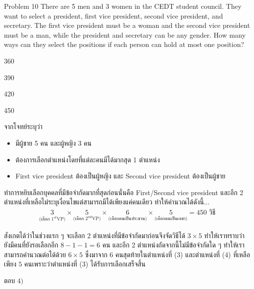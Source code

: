 \documentclass[11pt]{scrartcl}
\begin{document}
\newpage

\begin{problembox}{Problem 10}
There are 5 men and 3 women in the CEDT student council. They want to select a president, first vice president, second vice president, and secretary. The first vice president must be a woman and the second vice president must be a man, while the president and secretary can be any gender. How many ways can they select the positions if each person can hold at most one position?
 
\begin{choices}
\item 360
\item 390
\item 420
\item 450
\end{choices}
\end{problembox}

\begin{solutionbox}
  จากโจทย์ระบุว่า
  \begin{itemize}
    \item มีผู้ชาย 5 คน และผู้หญิง 3 คน
    \item ต้องการเลือกตำแหน่งโดยที่แต่ละคนมีได้มากสุด 1 ตำแหน่ง
    \item First vice president ต้องเป็นผู้หญิง และ Second vice president ต้องเป็นผู้ชาย 
  \end{itemize}
  
  ทำการหยิบเลือกบุคคลที่มีข้อจำกัดมากที่สุดก่อนนั่นคือ First/Second vice president และอีก 2 ตำแหน่งที่เหลือไม่ระบุเงื่อนไขแต่สามารถมีได้เพียงแค่คนเดียว ทำให้คำนวณได้ดังนี้...
  \begin{align*}
    \underset{\text{(เลือก $1^{st}$VP)}}{3} \times 
    \underset{\text{(เลือก $2^{nd}$VP})}{5} \times 
    \underset{\text{(เลือกคนเป็นประธาน)}}{6} \times 
    \underset{\text{(เลือกคนเป็นเลขา)}}{5}
    = 450 \text{ วิธี}
  \end{align*}

  สังเกตได้ว่าในช่วงแรก ๆ จะเลือก 2 ตำแหน่งที่มีข้อจำกัดมาก่อนจึงจัดวิธีได้ $3 \times 5$ ทำให้เราทราบว่ายังมีคนที่ยังรอเลือกอีก $8-1-1=6$ คน
  และอีก 2 ตำแหน่งถัดจากนี้ไม่มีข้อจำกัดใด ๆ ทำให้เราสามารถคำนวณต่อได้ด้วย $6 \times 5$ ซึ่งมาจาก 6 คนสุดท้ายในตำแหน่งที่ (3) 
  และตำแหน่งที่ (4) ที่เหลือเพียง $5$ คนเพราะว่าตำแหน่งที่ (3) ได้รับการเลือกเสร็จสิ้น

  ตอบ $\boxed{4)}$
\end{solutionbox}

\newpage
\end{document}

